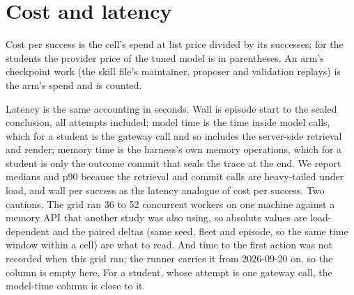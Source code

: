 \documentclass[11pt]{article}
\begin{document}
\begin{table}[H]
\centering\scriptsize
{}
\caption{The student distilled from the skill-file agent's traces (K0) against the memory-trace student and the frontier on the same seeds, paired; 95\% bootstrap intervals over cells.}
\label{tab:k0}
\end{table}


\section{Cost and latency}
\label{sec:cost}

Cost per success is the cell's spend at list price divided by its successes; for the students
the provider price of the tuned model is in parentheses. An arm's checkpoint work (the
skill file's maintainer, proposer and validation replays) is the arm's spend and is counted.

Latency is the same accounting in seconds. Wall is episode start to the sealed conclusion,
all attempts included; model time is the time inside model calls, which for a student is the
gateway call and so includes the server-side retrieval and render; memory time is the
harness's own memory operations, which for a student is only the outcome commit that seals
the trace at the end. We report medians and p90 because the retrieval and commit calls are
heavy-tailed under load, and wall per success as the latency analogue of cost per success.
Two cautions. The grid ran 36 to 52 concurrent workers on one machine against a memory API
that another study was also using, so absolute values are load-dependent and the paired
deltas (same seed, fleet and episode, so the same time window within a cell) are what to
read. And time to the first action was not recorded when this grid ran; the runner carries
it from 2026-09-20 on, so the column is empty here. For a student, whose attempt is one
gateway call, the model-time column is close to it.
\end{document}
